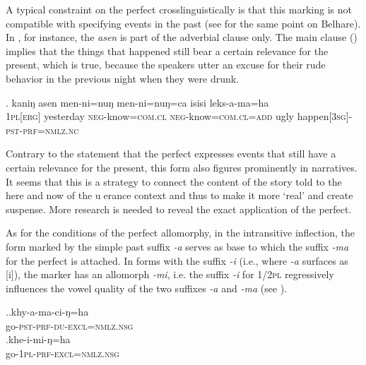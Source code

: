 A typical constraint on the perfect crosslinguistically is that this  marking is not compatible with specifying events in the past (see \citep[176]{Bickel1996Aspect} for the same point on Belhare). In \Next, for instance, the  \emph{asen} is part of the adverbial clause only. The main clause () implies that the things that happened still bear a certain relevance for the present, which is true, because the speakers utter an excuse for their rude behavior in the previous night when they were drunk.

\exg.	kaniŋ asen      men-ni=nuŋ         men-ni=nuŋ=ca                isisi leks-a-ma=ha\\
{\scshape  1pl[erg]} yesterday {\scshape neg-}know{\scshape =com.cl} {\scshape neg-}know{\scshape =com.cl=add} ugly happen{\scshape [3sg]-pst-prf=nmlz.nc}\\
 
	
Contrary to the statement that the perfect expresses events that still have a certain relevance for the present, this  form also figures prominently in narratives. It seems that this is a strategy to connect the content of the story told to the here and now of the uerance context and thus to make it more ‘real’ and create suspense. More research is needed to reveal the exact application of the perfect.

As for the conditions of the perfect allomorphy, in the intransitive inflection, the form marked by the simple past suffix \emph{-a} serves as base to which the suffix \emph{-ma} for the perfect is attached. In forms with the suffix \emph{-i}  (i.e., where \emph{-a} surfaces as [i]), the marker has an allomorph \emph{-mi}, i.e. the suffix \emph{-i} for  {\scshape 1/2pl} regressively influences the vowel quality of the two suffixes \emph{-a} and \emph{-ma} (see \Next). 

\ex.\ag.khy-a-ma-ci-ŋ=ha\\
go{\scshape -pst-prf-du-excl=nmlz.nsg}\\
\bg.khe-i-mi-ŋ=ha\\
go{\scshape -1pl-prf-excl=nmlz.nsg}\\


